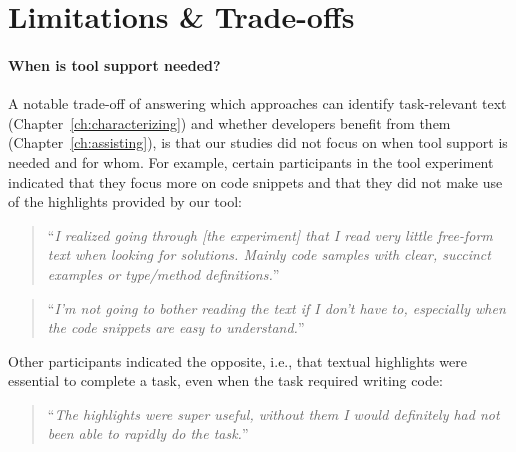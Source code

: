 



\section{Limitations \& Trade-offs}
\label{cp7:tools}






\paragraph{\textbf{When is tool support needed?}} 


A notable trade-off of answering which approaches can identify task-relevant text (Chapter~\ref{ch:characterizing}) and whether developers benefit from them (Chapter~\ref{ch:assisting}), is that our studies did not focus on when tool support is needed and for whom.
For example, certain participants in the \acs{tool} experiment indicated that they focus more on code snippets
and that they did not make use of the highlights provided by our tool:




\smallskip
\begin{footnotesize}
\begin{quote}
``\textit{I realized going through [the experiment] that I read very little free-form text when looking for solutions. Mainly code samples with clear, succinct examples or type/method definitions.}''
\end{quote}
\end{footnotesize}

\begin{footnotesize}
\begin{quote}
``\textit{I'm not going to bother reading the text if I don't have to, especially when the code snippets are easy to understand.}''
\end{quote}
\end{footnotesize}


Other participants indicated the opposite, i.e., that textual highlights were essential to complete a task, even when the task required writing code:



\smallskip
\begin{footnotesize}
    \begin{quote}
        ``\textit{The highlights were super useful, without them I would definitely had not been able to rapidly do the task.}''
    \end{quote}
\end{footnotesize}



